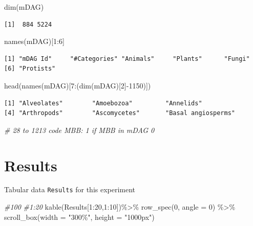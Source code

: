 \documentclass[
  letterpaper,
  DIV=11,
  numbers=noendperiod]{scrreprt}
\newenvironment{Shaded}{}{}
\newcommand{\AttributeTok}[1]{\textcolor[rgb]{0.78,0.47,0.87}{#1}}
\newcommand{\CommentTok}[1]{\textcolor[rgb]{0.36,0.39,0.44}{\textit{#1}}}
\newcommand{\DecValTok}[1]{\textcolor[rgb]{0.82,0.60,0.40}{#1}}
\newcommand{\FunctionTok}[1]{\textcolor[rgb]{0.38,0.69,0.94}{#1}}
\newcommand{\NormalTok}[1]{\textcolor[rgb]{0.67,0.70,0.75}{#1}}
\newcommand{\SpecialCharTok}[1]{\textcolor[rgb]{0.34,0.71,0.76}{#1}}
\newcommand{\StringTok}[1]{\textcolor[rgb]{0.60,0.76,0.47}{#1}}
\begin{document}
\begin{Shaded}
\begin{Highlighting}[]
\FunctionTok{dim}\NormalTok{(mDAG)}
\end{Highlighting}
\end{Shaded}

\begin{verbatim}
[1]  884 5224
\end{verbatim}

\begin{Shaded}
\begin{Highlighting}[]
\FunctionTok{names}\NormalTok{(mDAG)[}\DecValTok{1}\SpecialCharTok{:}\DecValTok{6}\NormalTok{]}
\end{Highlighting}
\end{Shaded}

\begin{verbatim}
[1] "mDAG Id"     "#Categories" "Animals"     "Plants"      "Fungi"      
[6] "Protists"   
\end{verbatim}

\begin{Shaded}
\begin{Highlighting}[]
\FunctionTok{head}\NormalTok{(}\FunctionTok{names}\NormalTok{(mDAG)[}\DecValTok{7}\SpecialCharTok{:}\NormalTok{(}\FunctionTok{dim}\NormalTok{(mDAG)[}\DecValTok{2}\NormalTok{]}\SpecialCharTok{{-}}\DecValTok{1150}\NormalTok{)])}
\end{Highlighting}
\end{Shaded}

\begin{verbatim}
[1] "Alveolates"        "Amoebozoa"         "Annelids"         
[4] "Arthropods"        "Ascomycetes"       "Basal angiosperms"
\end{verbatim}

\begin{Shaded}
\begin{Highlighting}[]
\CommentTok{\# 28 to 1213  code MBB: 1 if MBB in mDAG 0}
\end{Highlighting}
\end{Shaded}

\hypertarget{results}{%
\section{Results}\label{results}}

Tabular data \texttt{Results} for this experiment

\begin{Shaded}
\begin{Highlighting}[]
\CommentTok{\#100}
\CommentTok{\#1:20}
\FunctionTok{kable}\NormalTok{(Results[}\DecValTok{1}\SpecialCharTok{:}\DecValTok{20}\NormalTok{,}\DecValTok{1}\SpecialCharTok{:}\DecValTok{10}\NormalTok{])}\SpecialCharTok{\%\textgreater{}\%}
  \FunctionTok{row\_spec}\NormalTok{(}\DecValTok{0}\NormalTok{, }\AttributeTok{angle =} \DecValTok{0}\NormalTok{) }\SpecialCharTok{\%\textgreater{}\%}   
  \FunctionTok{scroll\_box}\NormalTok{(}\AttributeTok{width =} \StringTok{"300\%"}\NormalTok{, }\AttributeTok{height =} \StringTok{"1000px"}\NormalTok{)}
\end{Highlighting}
\end{Shaded}
\end{document}
